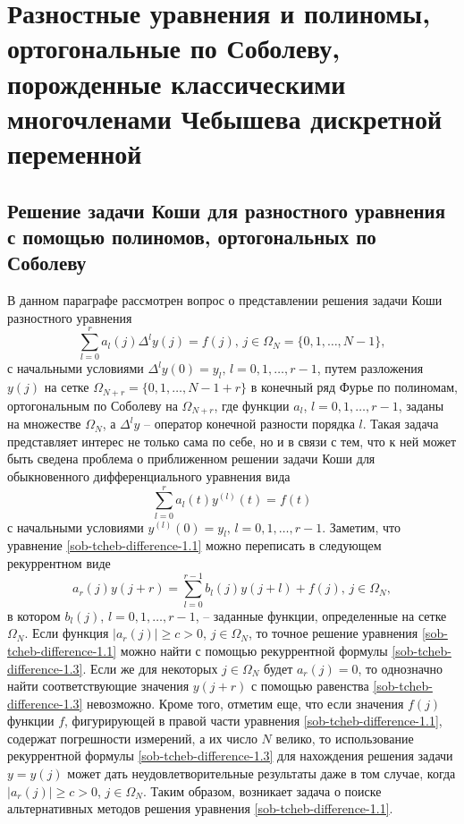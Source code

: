 \chapter{Разностные уравнения и полиномы, ортогональные по Соболеву, порожденные классическими многочленами Чебышева дискретной переменной}

\section{Решение задачи Коши для разностного уравнения с помощью полиномов, ортогональных по Соболеву}
\label{sob-tcheb-difference-s1}
В данном параграфе рассмотрен вопрос о представлении решения задачи Коши разностного уравнения
\begin{equation}\label{sob-tcheb-difference-1.1}
  \sum_{l=0}^{r}a_l(j)\Delta^{l}y(j)=f(j), \, j\in \Omega_{N}=\{0,1,\ldots,N-1\},
\end{equation}
с начальными условиями $\Delta^{l}y(0)=y_l, \, l=0,1,\ldots,r-1$,  путем разложения $y(j)$  на сетке $\Omega_{N+r}=\{0,1,\ldots,N-1+r\}$ в конечный ряд Фурье по полиномам, ортогональным по Соболеву на $\Omega_{N+r}$,  где функции $a_l$, $l=0,1,\ldots,r-1$, заданы на множестве $\Omega_{N}$, а $\Delta^{l}y$ -- оператор конечной разности порядка $l$.
 Такая задача представляет интерес не только сама по себе, но и в связи с тем, что к ней может быть сведена проблема  о приближенном решении задачи  Коши для обыкновенного дифференциального уравнения вида
\begin{equation}\label{sob-tcheb-difference-1.2}
  \sum_{l=0}^{r}a_l(t)y^{(l)}(t)=f(t)
\end{equation}
с начальными условиями $y^{(l)}(0)=y_l, \, l=0,1,\ldots,r-1$.
Заметим, что уравнение \eqref{sob-tcheb-difference-1.1} можно переписать в следующем рекуррентном виде
\begin{equation}\label{sob-tcheb-difference-1.3}
a_r(j)y(j+r)=\sum_{l=0}^{r-1}b_l(j)y(j+l)+f(j), \, j\in \Omega_{N},
\end{equation}
в котором $b_l(j)$, $l=0,1,\ldots,r-1$, --  заданные функции, определенные на сетке~$\Omega_{N}$. Если функция $|a_r(j)|\ge c>0$, $j\in \Omega_N$, то точное решение уравнения \eqref{sob-tcheb-difference-1.1} можно найти с помощью рекуррентной формулы \eqref{sob-tcheb-difference-1.3}. Если же для некоторых  $j\in \Omega_N$ будет $a_r(j)=0$, то однозначно найти соответствующие значения  $y(j+r)$  с помощью равенства  \eqref{sob-tcheb-difference-1.3} невозможно. Кроме того, отметим еще, что если значения  $f(j)$ функции $f$, фигурирующей в правой части уравнения \eqref{sob-tcheb-difference-1.1}, содержат погрешности измерений, а их число $N$ велико, то использование рекуррентной формулы \eqref{sob-tcheb-difference-1.3} для нахождения решения задачи $y=y(j)$ может дать неудовлетворительные результаты даже в том случае, когда $|a_r(j)|\ge c>0$, $j\in \Omega_N$. Таким образом, возникает задача о поиске альтернативных методов решения уравнения \eqref{sob-tcheb-difference-1.1}.


